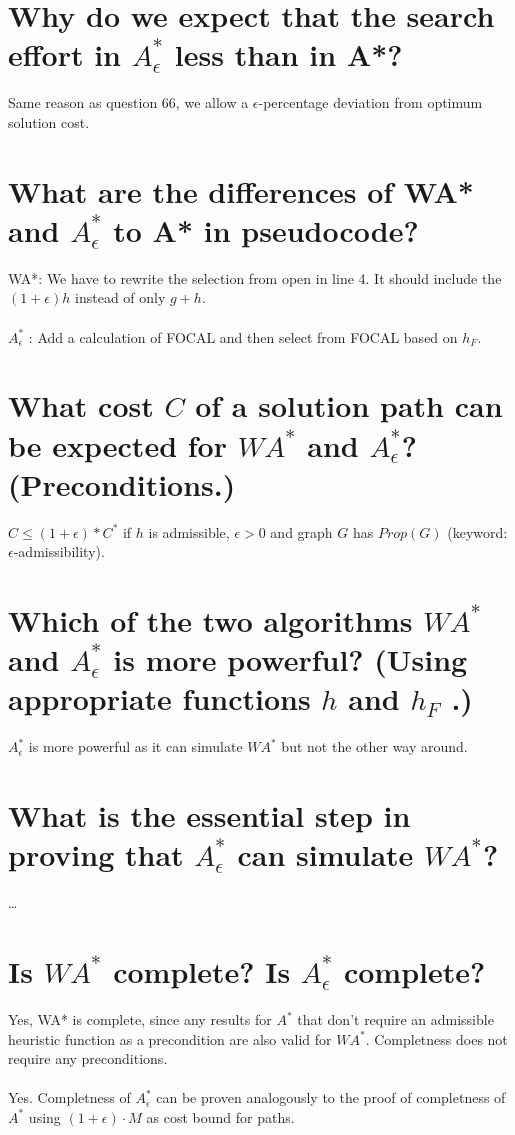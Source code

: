 \documentclass[12pt, a4paper]{article}
\begin{document}
\section{Why do we expect that the search effort in $A^*_\epsilon$ less than in A*?}
Same reason as question 66, we allow a $\epsilon$-percentage deviation from optimum solution cost.

\section{What are the differences of WA* and $A^*_\epsilon$ to A* in pseudocode?}
WA*: We have to rewrite the selection from open in line 4. It should include the $(1 + \epsilon)h$ instead of only $g + h$. \\ \\
$A^*_\epsilon$ : Add a calculation of FOCAL and then select from FOCAL based on $h_F$.

\section{What cost $C$ of a solution path can be expected for $WA^*$ and $A^*_\epsilon$? (Preconditions.)}
$C \leq (1 + \epsilon) * C^*$ if $h$ is admissible, $\epsilon > 0$ and graph $G$ has $Prop(G)$ (keyword: $\epsilon$-admissibility).

\section{Which of the two algorithms $WA^*$ and $A^*_\epsilon$ is more powerful? (Using appropriate functions $h$ and $h_F$ .)}
$A^*_\epsilon$ is more powerful as it can simulate $WA^*$ but not the other way around.  

\section{What is the essential step in proving that $A^*_\epsilon$ can simulate $WA^*$?}
\ldots

\section{Is $WA^*$ complete? Is $A^*_\epsilon$ complete?}
Yes, WA*  is complete, since any results for $A^*$ that don't require an admissible heuristic function as a precondition are also valid for $WA^*$. Completness does not require any preconditions. \\ \\
Yes. Completness of $A^*_\epsilon$ can be proven analogously to the proof of completness of $A^*$ using $(1 + \epsilon) \cdot M$ as cost bound for paths. 
\end{document}
